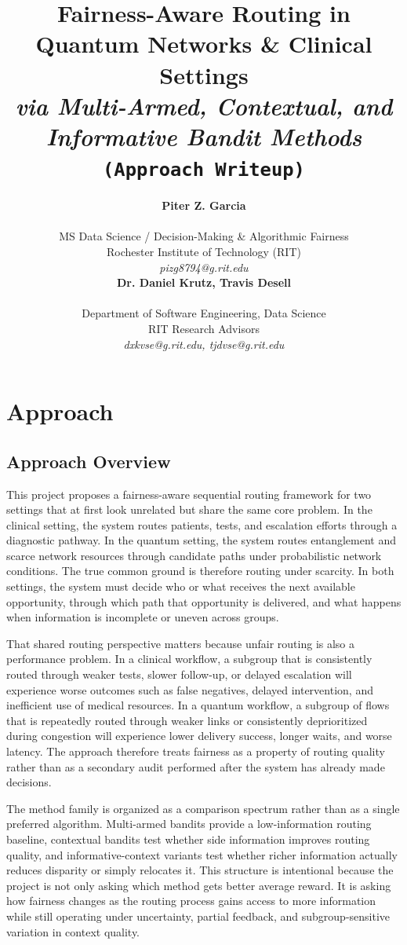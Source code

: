 \documentclass{IEEEtran}
\title{{\LARGE\textbf{Fairness-Aware Routing in Quantum Networks \& Clinical Settings}}\\
{\Large\textit{via Multi-Armed, Contextual, and Informative Bandit Methods}}\\
{\large\texttt{(Approach Writeup)}}}
\author{%
\begin{minipage}{0.48\textwidth}
\begin{center}
{\bf Piter Z. Garcia}\\
\begin{small}
MS Data Science / Decision-Making \& Algorithmic Fairness\\
Rochester Institute of Technology (RIT)\\
{\it pizg8794@g.rit.edu}
\end{small}
\end{center}
\end{minipage}
\hfill
\begin{minipage}{0.48\textwidth}
\begin{center}
{\bf Dr. Daniel Krutz, Travis Desell}\\
\begin{small}
Department of Software Engineering, Data Science\\
RIT Research Advisors\\
{\it dxkvse@g.rit.edu, tjdvse@g.rit.edu}
\end{small}
\end{center}
\end{minipage}%
}
\begin{document}
\maketitle
\vspace{-0.8em}

\section{Approach}

\subsection*{Approach Overview}
This project proposes a fairness-aware sequential routing framework for two settings that at first look unrelated but share the same core problem. In the clinical setting, the system routes patients, tests, and escalation efforts through a diagnostic pathway. In the quantum setting, the system routes entanglement and scarce network resources through candidate paths under probabilistic network conditions. The true common ground is therefore routing under scarcity. In both settings, the system must decide who or what receives the next available opportunity, through which path that opportunity is delivered, and what happens when information is incomplete or uneven across groups.

That shared routing perspective matters because unfair routing is also a performance problem. In a clinical workflow, a subgroup that is consistently routed through weaker tests, slower follow-up, or delayed escalation will experience worse outcomes such as false negatives, delayed intervention, and inefficient use of medical resources. In a quantum workflow, a subgroup of flows that is repeatedly routed through weaker links or consistently deprioritized during congestion will experience lower delivery success, longer waits, and worse latency. The approach therefore treats fairness as a property of routing quality rather than as a secondary audit performed after the system has already made decisions.

The method family is organized as a comparison spectrum rather than as a single preferred algorithm. Multi-armed bandits provide a low-information routing baseline, contextual bandits test whether side information improves routing quality, and informative-context variants test whether richer information actually reduces disparity or simply relocates it. This structure is intentional because the project is not only asking which method gets better average reward. It is asking how fairness changes as the routing process gains access to more information while still operating under uncertainty, partial feedback, and subgroup-sensitive variation in context quality.
\end{document}
